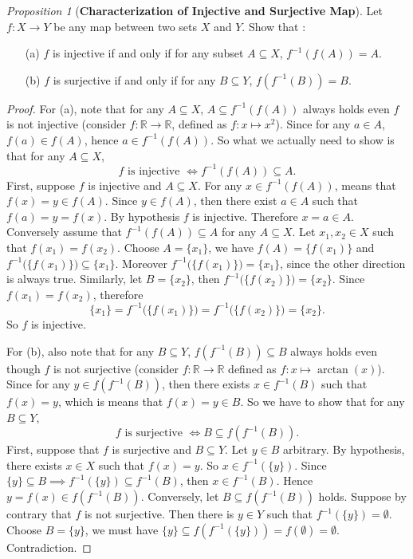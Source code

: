 \documentclass[a4paper]{article}
\theoremstyle{remark}
\newtheorem{prop}{Proposition}
\newcommand{\er}{\mathbb{R}} %
\newcommand{\subhim}{\subseteq} %
\begin{document}
\begin{prop}[\textbf{Characterization of Injective and Surjective Map}]
Let $f : X \to Y$ be any map between two sets $X$ and $Y$. Show that  :
\begin{enumerate}
\item[(a)] $f$ is injective if and only if for any subset $A \subhim X$, $f^{-1}(f(A)) = A$. 
\item[(b)] $f$ is surjective if and only if for any $B \subhim Y$, $f(f^{-1}(B)) = B$.
\end{enumerate}
\end{prop}
\begin{proof}
For (a), note that for any $A \subhim X$, $A \subhim f^{-1}(f(A))$ always holds even $f$ is not injective (consider $f : \er \to \er$, defined as $f : x\mapsto x^2$). Since for any $a \in A$, $f(a) \in f(A)$, hence $a \in f^{-1}(f(A))$. So what we actually need to show is that for any $A \subhim X$,
$$
f \text{ is injective } \iff f^{-1}(f(A)) \subhim A.
$$
First, suppose $f$ is injective and $A \subhim X$. For any $x \in f^{-1}(f(A))$, means that $f(x)=y \in f(A)$. Since $y \in f(A)$, then there exist $a \in A$ such that $f(a) = y = f(x)$. By hypothesis $f$ is injective. Therefore $x=a \in A$.  Conversely assume that $f^{-1}(f(A)) \subhim A$ for any $A \subhim X$. Let $x_1,x_2 \in X$ such that $f(x_1)  = f(x_2)$. Choose $A = \{x_1\}$, we have $f(A) = \{f(x_1)\}$ and $f^{-1}\big(\{f(x_1)\}\big) \subhim \{x_1\}$. Moreover $f^{-1}\big(\{f(x_1)\}\big) = \{x_1\}$, since the other direction is always true. Similarly, let $B = \{x_2\}$, then $f^{-1}\big(\{f(x_2)\}\big) = \{x_2\}$. Since $f(x_1) = f(x_2)$, therefore
$$
\{x_1\} = f^{-1}\big(\{f(x_1)\}\big) = f^{-1}\big(\{f(x_2)\}\big) = \{x_2\}.
$$
So $f$ is injective.

For (b), also note that for any $B \subhim Y$, $f(f^{-1}(B)) \subhim B$ always holds even though $f$ is not surjective (consider $f : \er \to \er$ defined as $f : x \mapsto \arctan(x)$). Since for any $y \in f(f^{-1}(B))$, then there exists $x \in f^{-1}(B)$ such that $f(x) = y$, which is means that $f(x) = y \in B$. So we have to show that for any $B \subhim Y$,
$$
f \text{ is surjective } \iff B \subhim f(f^{-1}(B)).
$$
First, suppose that $f$ is surjective and $B \subhim Y$. Let $y \in B$ arbitrary. By hypothesis, there exists $x \in X$ such that $f(x) = y$. So $x \in f^{-1}(\{y\})$. Since $\{y\} \subhim B \implies f^{-1}(\{y\}) \subhim f^{-1}(B)$, then $x \in f^{-1}(B)$. Hence $y=f(x) \in f(f^{-1}(B))$. Conversely, let $B \subhim f(f^{-1}(B))$ holds. Suppose by contrary that $f$ is not surjective. Then there is $y \in Y$ such that $f^{-1}(\{y\}) = \emptyset$. Choose $B = \{y\}$, we must have $\{y\} \subhim f(f^{-1}(\{y\})) = f(\emptyset) = \emptyset$. Contradiction.
\end{proof}
\end{document}
